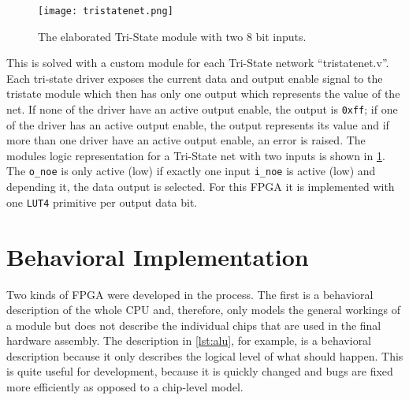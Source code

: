\begin{figure}[t]
  \centering
  \texttt{[image: tristatenet.png]}
  \caption{The elaborated Tri-State module with two 8 bit inputs.}
  \label{fig:tristatenet}
\end{figure}
This is solved with a custom module for each Tri-State network ``tristatenet.v''.
Each tri-state driver exposes the current data and output enable signal to the tristate module which then has only one output which represents the value of the net.
If none of the driver have an active output enable, the output is \texttt{0xff}; if one of the driver has an active output enable, the output represents its value and if more than one driver have an active output enable, an error is raised.
The modules logic representation for a Tri-State net with two inputs is shown in \cref{fig:tristatenet}.
The \texttt{o\_noe} is only active (low) if exactly one input \texttt{i\_noe} is active (low) and depending it, the data output is selected.
For this \gls{FPGA} it is implemented with one \texttt{LUT4} primitive per output data bit.

\section{Behavioral Implementation}
Two kinds of \gls{FPGA} were developed in the process.
The first is a behavioral description of the whole \gls{CPU} and, therefore, only models the general workings of a module but does not describe the individual chips that are used in the final hardware assembly.
The description in \cref{lst:alu}, for example, is a behavioral description because it only describes the logical level of what should happen.
This is quite useful for development, because it is quickly changed and bugs are fixed more efficiently as opposed to a chip-level model.

